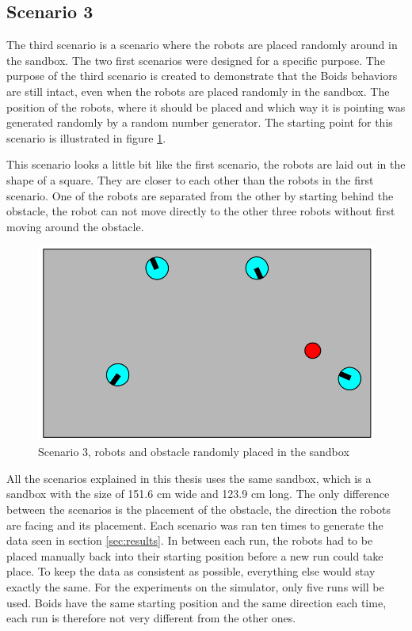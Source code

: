 \subsection{Scenario 3}
The third scenario is a scenario where the robots are placed randomly around in the sandbox. The two first scenarios were designed for a specific purpose. The purpose of the third scenario is created to demonstrate that the Boids behaviors are still intact, even when the robots are placed randomly in the sandbox. The position of the robots, where it should be placed and which way it is pointing was generated randomly by a random number generator. The starting point for this scenario is illustrated in figure \ref{fig:scenario3}. 

This scenario looks a little bit like the first scenario, the robots are laid out in the shape of a square. They are closer to each other than the robots in the first scenario. One of the robots are separated from the other by starting behind the obstacle, the robot can not move directly to the other three robots without first moving around the obstacle.
\begin{figure}[h!]
\begin{center}
\includegraphics[width=0.8\linewidth]{figs/scenario2}
\end{center}
\caption[scenario 3]{Scenario 3, robots and obstacle randomly placed in the sandbox}
\label{fig:scenario3}
\end{figure}

All the scenarios explained in this thesis uses the same sandbox, which is a sandbox with the size of 151.6 cm wide and 123.9 cm long. The only difference between the scenarios is the placement of the obstacle, the direction the robots are facing and its placement. Each scenario was ran ten times to generate the data seen in section \ref{sec:results}.
In between each run, the robots had to be placed manually back into their starting position before a new run could take place. To keep the data as consistent as possible, everything else would stay exactly the same.
For the experiments on the simulator, only five runs will be used. Boids have the same starting position and the same direction each time, each run is therefore not very different from the other ones. 

